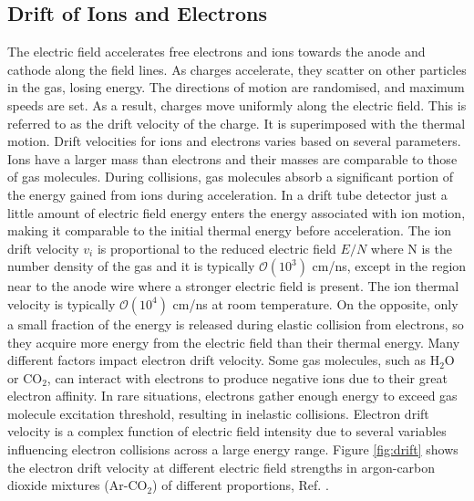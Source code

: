 \subsection{Drift of Ions and Electrons}
The electric field accelerates free electrons and ions towards the anode and cathode 
along the field lines. As charges accelerate, they scatter on other particles in the gas, 
losing energy. The directions of motion are randomised, and maximum speeds are set. As a result, 
charges move uniformly along the electric field. This is referred to as the drift velocity of the 
charge. It is superimposed with the thermal motion.
Drift velocities for ions and electrons varies based on several parameters. Ions have a larger mass 
than electrons and their masses are comparable to those of gas molecules. During collisions, gas 
molecules absorb a significant portion of the energy gained from ions during acceleration. In a drift 
tube detector just a little amount of electric field energy enters the energy associated with ion motion, 
making it comparable to the initial thermal energy before acceleration. 
The ion drift velocity $v_i$ is proportional to the reduced electric field $E/N$ where N is the number density of the gas 
and it is typically $\mathcal{O}(10^3)$ cm/ns, except in the region near to the anode wire where a stronger 
electric field is present. The ion thermal velocity is typically $\mathcal{O}(10^4)$ cm/ns at room temperature.
On the opposite, only a small fraction of the energy is released during elastic collision from electrons, 
so they acquire more energy from the electric field than their thermal energy.
Many different factors impact electron drift velocity. Some gas molecules, such as H$_2$O or CO$_2$, 
can interact with electrons to produce negative ions due to their great electron affinity. In rare situations, 
electrons gather enough energy to exceed gas molecule excitation threshold, resulting in inelastic collisions. 
Electron drift velocity is a complex function of electric field intensity due to several variables influencing 
electron collisions across a large energy range. Figure \ref{fig:drift} shows the electron drift
velocity at different electric field strengths in argon-carbon dioxide mixtures (Ar-CO$_2$) of different
proportions, Ref. \cite{ZHAO1994485}.
